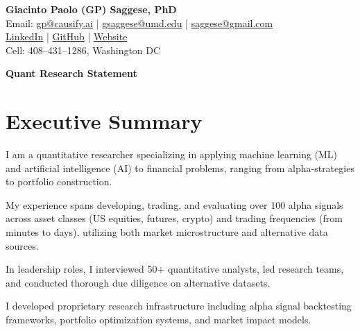 \documentclass[11pt, letterpaper]{article}
\begin{document}
  \begin{center}
    {\LARGE \textbf{Giacinto Paolo (GP) Saggese, PhD}} \\[6pt]

    {\large Email: \href{mailto:gp@causify.ai}{gp@causify.ai} \;|\; \href{mailto:gsaggese@umd.edu}{gsaggese@umd.edu} \;|\; \href{mailto:saggese@gmail.com}{saggese@gmail.com} }\\[6pt]

    {\large \href{https://www.linkedin.com/in/gpsaggese/}{LinkedIn} \;|\; \href{https://github.com/gpsaggese}{GitHub} \;|\; \href{https://gpsaggese.github.io/}{Website} }\\[6pt]

    {\large Cell: 408--431--1286, Washington DC }
  \end{center}

  \vspace{12pt}

  \begin{center}
    {\LARGE \textbf{Quant Research Statement}}
  \end{center}

  \vspace{12pt}

  \tableofcontents
  \newpage

  \section{Executive Summary}
  \label{executive-summary}

  I am a quantitative researcher specializing in applying machine
  learning (ML) and artificial intelligence (AI) to financial problems, ranging
  from alpha-strategies to portfolio construction.

  My experience spans developing, trading, and evaluating over 100 alpha
  signals across asset classes (US equities, futures, crypto) and trading
  frequencies (from minutes to days), utilizing both market microstructure
  and alternative data sources.

  In leadership roles, I interviewed 50+ quantitative analysts, led research
  teams, and conducted thorough due diligence on alternative datasets.

  I developed proprietary research infrastructure including alpha signal
  backtesting frameworks, portfolio optimization systems, and market impact
  models.
\end{document}
